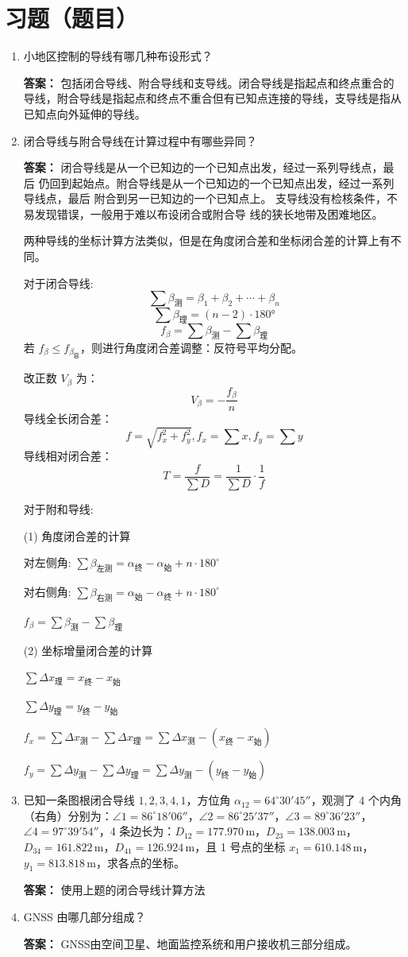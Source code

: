 \documentclass[12pt,a4paper]{article}
\newcounter{question}
\newenvironment{questions}{
    \setcounter{question}{0}
    \section*{习题（题目）}
    \begin{enumerate}[leftmargin=1.5em,label={\arabic*．}]
}{
    \end{enumerate}
}
\newcommand{\answer}[1]{\par\noindent\textbf{答案：} #1\par\vspace{1em}}
\begin{document}
\begin{questions}
    \item 小地区控制的导线有哪几种布设形式？
    \answer{包括闭合导线、附合导线和支导线。闭合导线是指起点和终点重合的导线，附合导线是指起点和终点不重合但有已知点连接的导线，支导线是指从已知点向外延伸的导线。}
    \item 闭合导线与附合导线在计算过程中有哪些异同？
    \answer{
        闭合导线是从一个已知边的一个已知点出发，经过一系列导线点，最后
仍回到起始点。附合导线是从一个已知边的一个已知点出发，经过一系列导线点，最后
附合到另一已知边的一个已知点上。 支导线没有检核条件，不易发现错误，一般用于难以布设闭合或附合导
线的狭长地带及困难地区。

两种导线的坐标计算方法类似，但是在角度闭合差和坐标闭合差的计算上有不同。

对于闭合导线:
\[
\sum \beta_{\text{测}} = \beta_1 + \beta_2 + \cdots + \beta_n
\]
\[
\sum \beta_{\text{理}} = (n - 2) \cdot 180°
\]
\[
f_{\beta} = \sum \beta_{\text{测}} - \sum \beta_{\text{理}}
\]
若 \( f_{\beta} \leq f_{\beta_{\text{容}}} \)，则进行角度闭合差调整：反符号平均分配。

改正数 \( V_{\beta} \) 为：
\[
V_{\beta} = -\frac{f_{\beta}}{n}
\]
导线全长闭合差：
\[ f = \sqrt{f_x^2 + f_y^2},f_x = \sum x ,f_y= \sum y \]
导线相对闭合差：
\[ T = \frac{f}{\sum D} = \frac{1}{\sum D} \cdot \frac{1}{f} \]

对于附和导线:

(1) 角度闭合差的计算

对左侧角: \(\sum \beta_{\text{左测}} = \alpha_{\text{终}} - \alpha_{\text{始}} + n \cdot 180^\circ\)

对右侧角: \(\sum \beta_{\text{右测}} = \alpha_{\text{始}} - \alpha_{\text{终}} + n \cdot 180^\circ\)

\(f_{\beta} = \sum \beta_{\text{测}} - \sum \beta_{\text{理}}\)

(2) 坐标增量闭合差的计算

\(\sum \Delta x_{\text{理}} = x_{\text{终}} - x_{\text{始}}\)

\(\sum \Delta y_{\text{理}} = y_{\text{终}} - y_{\text{始}}\)

\(f_{x} = \sum \Delta x_{\text{测}} - \sum \Delta x_{\text{理}} = \sum \Delta x_{\text{测}} - (x_{\text{终}} - x_{\text{始}})\)

\(f_{y} = \sum \Delta y_{\text{测}} - \sum \Delta y_{\text{理}} = \sum \Delta y_{\text{测}} - (y_{\text{终}} - y_{\text{始}})\)
}
\item 已知一条图根闭合导线 $1,2,3,4,1$，方位角 $\alpha_{12} = 64^\circ 30' 45''$，观测了 4 个内角（右角）分别为：$\angle 1 = 86^\circ 18' 06''$，$\angle 2 = 86^\circ 25' 37''$，$\angle 3 = 89^\circ 36' 23''$，$\angle 4 = 97^\circ 39' 54''$，4 条边长为：$D_{12} = 177.970\,\text{m}$，$D_{23} = 138.003\,\text{m}$，$D_{34} = 161.822\,\text{m}$，$D_{41} = 126.924\,\text{m}$，且 1 号点的坐标 $x_1 = 610.148\,\text{m}$，$y_1 = 813.818\,\text{m}$，求各点的坐标。

\answer{使用上题的闭合导线计算方法}

\item GNSS 由哪几部分组成？
\answer{GNSS由空间卫星、地面监控系统和用户接收机三部分组成。}
\end{questions}
\end{document}
